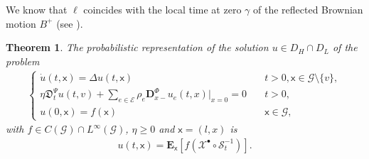 \documentclass[11pt,a4paper]{article}
\theoremstyle{plain}
\newtheorem{theorem}{Theorem}[section]
\theoremstyle{definition}
\theoremstyle{remark}
\begin{document}
		We know that $\ell$ coincides with the local time at zero $\gamma$ of the reflected Brownian motion $B^+$ (see \cite[Corollary 8]{BonDov}).
		\begin{theorem}
			\label{thm:Xpallinodelay}
			The probabilistic representation of the solution $u \in D_H \cap D_L$ of the problem
			\begin{align*}
				\begin{cases}
					\dot{u}(t,\mathsf{x})= \Delta u(t,\mathsf{x}) \quad &t>0, \mathsf{x} \in \mathcal{G}\setminus \{v\}, \\
					\eta \mathfrak{D}_t^\Psi u(t,v)+ \sum_{e \in \mathcal{E}} \rho_e\mathbf{D}^\Phi_{x-} u_e(t,x)\big\vert_{x=0}=0 \quad    &t>0,\\
					u(0,\mathsf{x})=f(\mathsf{x}) \quad &\mathsf{x} \in \mathcal{G},
				\end{cases}
			\end{align*}
			with $f \in C(\mathcal{G}) \cap L^\infty(\mathcal{G})$, $\eta \geq 0$  and $\mathsf{x}=(l,x)$ is
			\begin{align*}
				u(t,\mathsf{x})=\mathbf{E}_\mathsf{x}[f(\mathcal{X}^\bullet \circ \mathcal{S}^{-1}_t)].
			\end{align*}
		\end{theorem}
\end{document}

